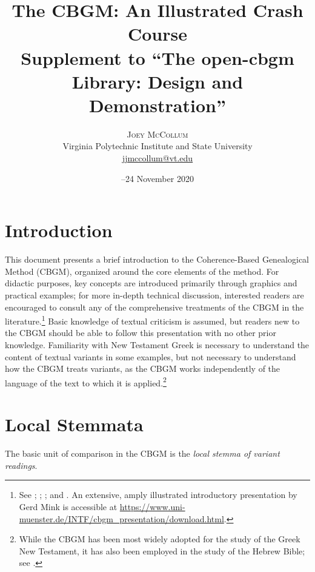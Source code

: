 \documentclass[a4paper, 12pt]{article}
\title{{\Large\titlefont The CBGM: An Illustrated Crash Course}\\{\large\titlefont\color{HokieStone}Supplement to ``The open-cbgm Library: Design and Demonstration''}}
\author{{\normalsize\sf\textsc{Joey McCollum}}\\{\normalsize\sf Virginia Polytechnic Institute and State University}\\{\normalsize\sf\url{jjmccollum@vt.edu}}}
\date{{\normalsize\sf 21–24 November 2020}}
\begin{document}
	\maketitle
	\section*{Introduction}
	This document presents a brief introduction to the Coherence-Based Genealogical Method (CBGM), organized around the core elements of the method. For didactic purposes, key concepts are introduced primarily through graphics and practical examples; for more in-depth technical discussion, interested readers are encouraged to consult any of the comprehensive treatments of the CBGM in the literature.\footnote{See \cite{Mink04}; \cite{Gurry16}; \cite{WG17}; and \cite{Gurry17}. An extensive, amply illustrated introductory presentation by Gerd Mink is accessible at \url{https://www.uni-muenster.de/INTF/cbgm_presentation/download.html}.} Basic knowledge of textual criticism is assumed, but readers new to the CBGM should be able to follow this presentation with no other prior knowledge. Familiarity with New Testament Greek is necessary to understand the content of textual variants in some examples, but not necessary to understand how the CBGM treats variants, as the CBGM works independently of the language of the text to which it is applied.\footnote{While the CBGM has been most widely adopted for the study of the Greek New Testament, it has also been employed in the study of the Hebrew Bible; see \cite{Ellis18}.}
	
	\section{Local Stemmata}\label{sec:local-stemmata}
	The basic unit of comparison in the CBGM is the \emph{local stemma of variant readings}. 
	
\end{document}
